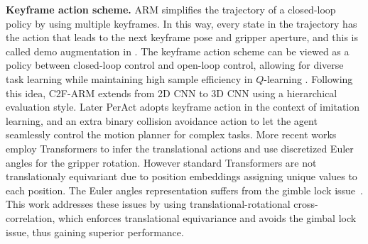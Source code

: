 \textbf{Keyframe action scheme.}
ARM \cite{james2021arm} simplifies the trajectory of a closed-loop policy by using multiple keyframes. In this way, every state in the trajectory has the action that leads to the next keyframe pose and gripper aperture, and this is called demo augmentation in \cite{james2021arm}. The keyframe action scheme can be viewed as a policy between closed-loop control and open-loop control, allowing for diverse task learning while maintaining high sample efficiency in $Q$-learning \cite{james2021arm}. Following this idea, C2F-ARM\cite{james2022coarse} extends \cite{james2021arm} from 2D CNN to 3D CNN using a hierarchical evaluation style.
Later PerAct \cite{shridhar2023perceiver} adopts keyframe action in the context of imitation learning, and an extra binary collision avoidance action to let the agent seamlessly control the motion planner for complex tasks. 
More recent works ~\cite{shridhar2023perceiver, rvt, gervet2023act3d} employ Transformers to infer the translational actions and use discretized Euler angles for the gripper rotation. However standard Transformers\cite{vaswani2017attention} are not translationaly equivariant due to position embeddings assigning unique values to each position. The Euler angles representation suffers from the gimble lock issue~\cite{5D_SO3}. This work addresses these issues by using translational-rotational cross-correlation, which enforces translational equivariance and avoids the gimbal lock issue, thus gaining superior performance.

